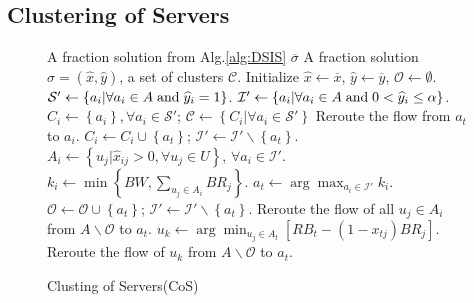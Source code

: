 \documentclass[journal]{IEEEtran}
\begin{document}
\subsection{Clustering of Servers}
\begin{figure}[!t]
	\renewcommand{\algorithmicrequire}{\textbf{Input:}}
	\renewcommand{\algorithmicensure}{\textbf{Output:}}
	\begin{algorithm}[H]
		\caption{Clusting of Servers(CoS)}
		\begin{algorithmic}[1]\label{alg:CoS}
			\REQUIRE A fraction solution from Alg.\ref{alg:DSIS} $\overline{\sigma}$
			\ENSURE A fraction solution $\widehat \sigma = ({\widehat x},{\widehat y})$, a set of clusters $\mathcal{C}$.
			\STATE Initialize $\widehat x \leftarrow \overline x$, $\widehat y \leftarrow \overline y$, $\mathcal{O} \leftarrow \emptyset$.
			\STATE ${\mathcal{S}'} \leftarrow \left\{ {{a_i}|\forall{a_i} \in A\; {\rm{and}} \; {{\widehat y}_i} = 1} \right\}$.
			\STATE ${\mathcal{I}'} \leftarrow \left\{ {{a_i}|\forall{a_i} \in A\; {\rm{and}} \; 0<{{\widehat y}_i} \le \alpha} \right\}$.
			\STATE  $C_i \leftarrow \left\{a_i\right\}, \forall a_i \in \mathcal{S}'$; $\mathcal{C} \leftarrow \left\{C_i| \forall a_i\in \mathcal{S}'\right\}$
			\STATE Reroute the flow from $a_t$ to $a_i$.
			\STATE $C_i \leftarrow C_i \cup \left\{a_t\right\}$; $\mathcal{I}' \leftarrow \mathcal{I}' \backslash \left\{a_t\right\}$.
			\ENDIF
			\ENDFOR
			\STATE $A_i \leftarrow \left\{u_j| \widehat{x}_{ij} > 0, \forall u_j \in U \right\}$, $\forall a_i \in \mathcal{I}'$.
			\STATE $k_i \leftarrow \min \left\{BW, \sum\nolimits_{{u_j} \in A_i} {{BR_j}} \right\}$.
			\STATE $a_t \leftarrow \arg\max_{a_i \in \mathcal{I}'}{k_i}$.
			\STATE $\mathcal{O} \leftarrow  \mathcal{O} \cup \left\{a_t\right\}$; $\mathcal{I}' \leftarrow \mathcal{I}' \backslash \left\{a_t\right\}$.
			\STATE Reroute the flow of all $u_j\in A_i$ from $A \backslash \mathcal{O}$ to $a_t$. 
			\ENDIF
			\STATE $u_k \leftarrow \arg\min_{u_j \in A_t}\left[RB_t - (1-x_{tj})BR_j\right]$.
			\STATE Reroute the flow of $u_k$ from $A \backslash \mathcal{O}$ to $a_t$.

\end{algorithmic}
\end{algorithm}
\end{figure}
\end{document}
